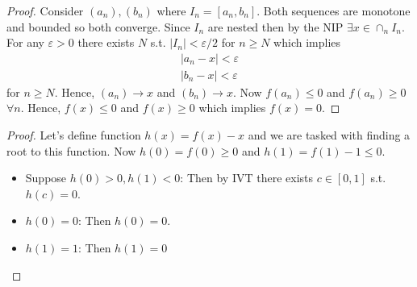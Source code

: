 \begin{proof}
    Consider $(a_n), (b_n)$ where $I_n=[a_n,b_n]$.
    Both sequences are monotone and bounded so both converge.
    Since $I_n$ are nested then by the NIP $\exists x\in \cap_n I_n$.
    For any $\varepsilon>0$ there exists $N$ s.t. $|I_n|<\varepsilon/2$ 
    for $n\geq N$ which implies 
    \begin{gather*}
        |a_n-x| < \varepsilon \\
        |b_n-x| < \varepsilon
    \end{gather*}
    for $n\geq N$. Hence, $(a_n)\rightarrow x$ and $(b_n)\rightarrow x$.
    Now $f(a_n)\leq 0$ and $f(a_n)\geq 0$ $\forall n$. Hence, 
    $f(x)\leq 0$ and $f(x)\geq 0$ which implies $f(x)=0$. 
\end{proof}

\begin{proof}
    Let's define function $h(x)=f(x)-x$ and we are tasked with finding 
    a root to this function. 
    Now $h(0)=f(0)\geq 0$ and $h(1)=f(1)-1\leq 0$.
    \begin{itemize}
        \item Suppose $h(0)>0, h(1)<0$: Then by IVT there exists 
        $c\in [0,1]$ s.t. $h(c)=0$.

        \item $h(0)=0$: Then $h(0)=0$.
        \item $h(1)=1$: Then $h(1)=0$
    \end{itemize}
\end{proof}